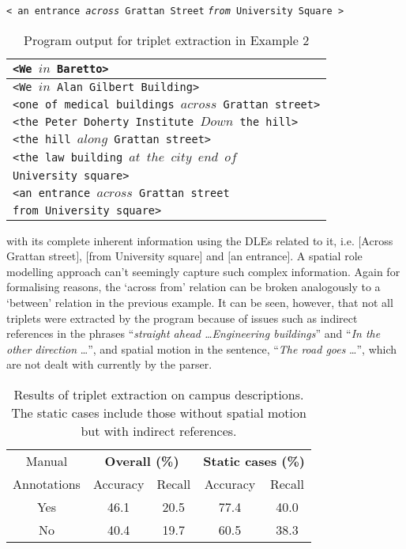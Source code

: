 \documentclass[letter]{sig-alternate}
\begin{document}
\texttt{< an entrance \textit{across} Grattan Street} \texttt{\textit{from} University Square >}
\begin{table}
\begin{tabular}{|l|}
\hline
\texttt{<We $in$ Baretto>}\\ \hline
\texttt{<We $in$  Alan Gilbert Building>}\\ \hline
\texttt{<one of medical buildings $across$ Grattan street>}\\ \hline
\texttt{<the Peter Doherty Institute $Down$ the hill>}\\ \hline
\texttt{<the hill $along$ Grattan street>}\\ \hline
\texttt{<the law building $at$  $the$ $city$ $end$ $of$ }\\
\texttt{University square>}\\ \hline
\texttt{<an entrance $across$  Grattan street} \\
\texttt{from University square>}\\ \hline
\end{tabular}
\caption{Program output for triplet extraction in Example 2}
\label{table:ex2}
\end{table}
with its complete inherent information using the DLEs related to it, i.e. $[$Across Grattan street$]$, $[$from University square$]$ and $[$an entrance$]$. A spatial role modelling approach can't seemingly capture such complex information. Again for formalising reasons, the `across from' relation can be broken analogously to a `between' relation in the previous example. It can be seen, however, that not all triplets were extracted by the program because of issues such as indirect references in the phrases ``\textit{straight ahead \dots Engineering buildings}'' and ``\textit{In the other direction} \dots'', and spatial motion in the sentence, ``\textit{The road goes} \dots'', which are not dealt with currently by the parser.
\begin{table}
\centering
\begin{tabular}{|c|c|c|c|c|} \hline
Manual&\multicolumn{2}{|c|}{\textbf{Overall (\%)}}&\multicolumn{2}{|c|}{\textbf{Static cases (\%)}} \\ \cline{2-5}
Annotations&Accuracy&Recall&Accuracy&Recall\\ \cline{1-5}
Yes&46.1&20.5&77.4&40.0\\\hline
No&40.4&19.7&60.5&38.3\\\hline
\end{tabular}
\caption{Results of triplet extraction on campus descriptions. The static cases include those without spatial motion but with indirect references.}
\label{table:stats}
\end{table}
\end{document}
